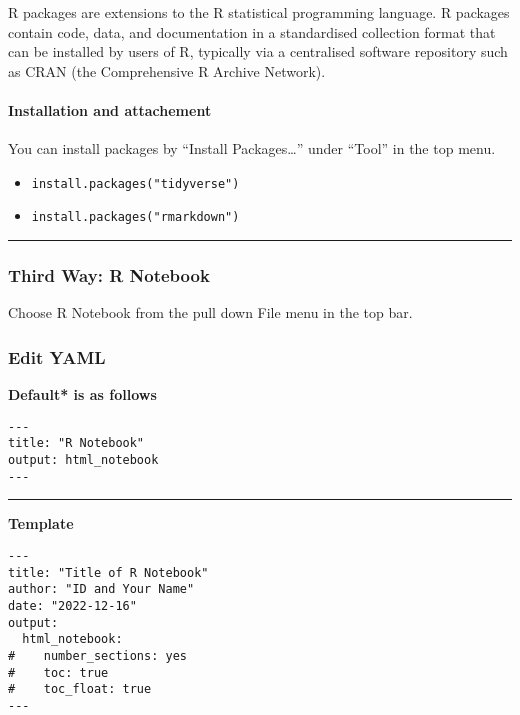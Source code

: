 \documentclass[
]{article}
\providecommand{\tightlist}{%
  \setlength{\itemsep}{0pt}\setlength{\parskip}{0pt}}
\begin{document}
R packages are extensions to the R statistical programming language. R
packages contain code, data, and documentation in a standardised
collection format that can be installed by users of R, typically via a
centralised software repository such as CRAN (the Comprehensive R
Archive Network).

\hypertarget{installation-and-attachement}{%
\paragraph{Installation and
attachement}\label{installation-and-attachement}}

You can install packages by ``Install Packages\ldots{}'' under ``Tool''
in the top menu.

\begin{itemize}
\tightlist
\item
  \texttt{install.packages("tidyverse")}
\item
  \texttt{install.packages("rmarkdown")}
\end{itemize}

\begin{center}\rule{0.5\linewidth}{0.5pt}\end{center}

\hypertarget{third-way-r-notebook}{%
\subsubsection{Third Way: R Notebook}\label{third-way-r-notebook}}

Choose R Notebook from the pull down File menu in the top bar.

\hypertarget{edit-yaml}{%
\subsubsection{Edit YAML}\label{edit-yaml}}

\textbf{Default* is as follows}

\begin{verbatim}
---
title: "R Notebook"
output: html_notebook
---
\end{verbatim}

\begin{center}\rule{0.5\linewidth}{0.5pt}\end{center}

\textbf{Template}

\begin{verbatim}
---
title: "Title of R Notebook"
author: "ID and Your Name"
date: "2022-12-16" 
output: 
  html_notebook:
#    number_sections: yes
#    toc: true
#    toc_float: true
---
\end{verbatim}
\end{document}
